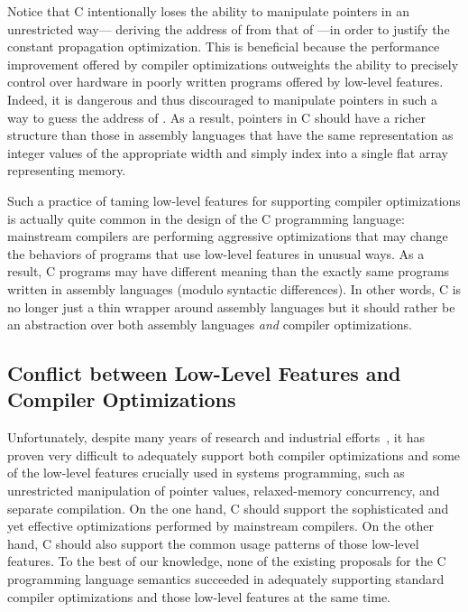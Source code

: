 Notice that C intentionally loses the ability to manipulate pointers in an unrestricted way---\eg{}
deriving the address of  from that of ---in order to justify the constant
propagation optimization.  This is beneficial because the performance improvement offered by
compiler optimizations outweights the ability to precisely control over hardware in poorly written
programs offered by low-level features.  Indeed, it is dangerous and thus discouraged to manipulate
pointers in such a way to guess the address of .  As a result, pointers in C should have a
richer structure than those in assembly languages that have the same representation as integer
values of the appropriate width and simply index into a single flat array representing memory.

Such a practice of taming low-level features for supporting compiler optimizations is actually quite
common in the design of the C programming language: mainstream compilers are performing aggressive
optimizations that may change the behaviors of programs that use low-level features in unusual ways.
As a result, C programs may have different meaning than the exactly same programs written in
assembly languages (modulo syntactic differences).  In other words, C is no longer just a thin
wrapper around assembly languages but it should rather be an abstraction over both assembly
languages \emph{and} compiler optimizations.



\subsection{Conflict between Low-Level Features and Compiler Optimizations}
\label{sec:introduction:problem}

Unfortunately, despite many years of research and industrial efforts~\cite{c18}, it has proven very
difficult to adequately support both compiler optimizations and some of the low-level features
crucially used in systems programming, such as unrestricted manipulation of pointer values,
relaxed-memory concurrency, and separate compilation.  On the one hand, C should support the
sophisticated and yet effective optimizations performed by mainstream compilers.  On the other hand,
C should also support the common usage patterns of those low-level features.  To the best of our
knowledge, none of the existing proposals for the C programming language semantics succeeded in
adequately supporting standard compiler optimizations and those low-level features at the same time.

